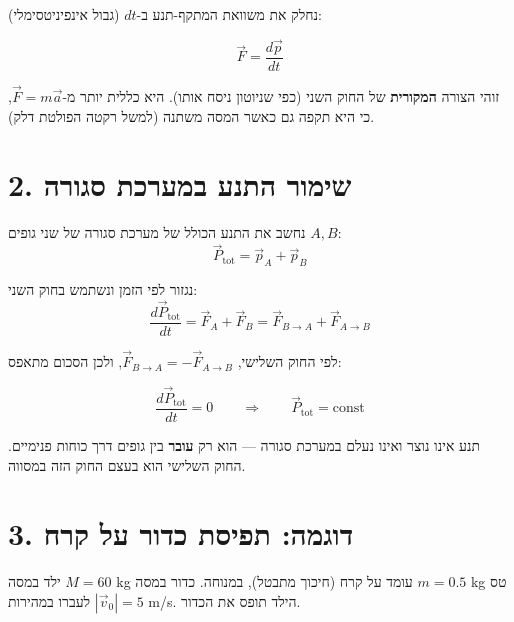 \documentclass[12pt, a4paper]{article}
\newcommand{\hvec}[1]{\overrightarrow{#1}}
\begin{document}
נחלק את משוואת המתקף-תנע ב-\textenglish{$dt$} (גבול אינפיניטסימלי):

\begin{tcolorbox}[resultbox]
\[
  \hvec{F} = \frac{d\hvec{p}}{dt}
\]
\end{tcolorbox}

זוהי הצורה \textbf{המקורית} של החוק השני (כפי שניוטון ניסח אותו). היא כללית יותר מ-\textenglish{$\hvec{F} = m\hvec{a}$}, כי היא תקפה גם כאשר המסה משתנה (למשל רקטה הפולטת דלק).

\section*{2. שימור התנע במערכת סגורה}

נחשב את התנע הכולל של מערכת סגורה של שני גופים \textenglish{$A, B$}:
\[
  \hvec{P}_{\text{tot}} = \hvec{p}_A + \hvec{p}_B
\]

נגזור לפי הזמן ונשתמש בחוק השני:
\[
  \frac{d\hvec{P}_{\text{tot}}}{dt} = \hvec{F}_A + \hvec{F}_B
  = \hvec{F}_{B\to A} + \hvec{F}_{A\to B}
\]

לפי החוק השלישי, \textenglish{$\hvec{F}_{B\to A} = -\hvec{F}_{A\to B}$}, ולכן הסכום מתאפס:

\begin{tcolorbox}[resultbox, title={חוק שימור התנע}]
\[
  \frac{d\hvec{P}_{\text{tot}}}{dt} = 0
  \qquad\Longrightarrow\qquad
  \hvec{P}_{\text{tot}} = \text{const}
\]
\end{tcolorbox}

\begin{tcolorbox}[notebox]
תנע אינו נוצר ואינו נעלם במערכת סגורה --- הוא רק \textbf{עובר} בין גופים דרך כוחות פנימיים. החוק השלישי הוא בעצם החוק הזה במסווה.
\end{tcolorbox}

\section*{3. דוגמה: תפיסת כדור על קרח}

ילד במסה \textenglish{$M = 60$ kg} עומד על קרח (חיכוך מתבטל), במנוחה. כדור במסה \textenglish{$m = 0.5$ kg} טס לעברו במהירות \textenglish{$|\hvec{v}_0| = 5$ m/s}. הילד תופס את הכדור.
\end{document}
